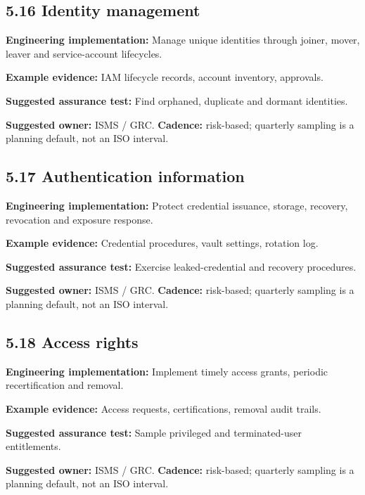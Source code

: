 \documentclass[11pt,letterpaper]{article}
\begin{document}
\subsection{5.16 Identity management}
\textbf{Engineering implementation:} Manage unique identities through joiner, mover, leaver and service-account lifecycles.\par
\textbf{Example evidence:} IAM lifecycle records, account inventory, approvals.\par
\textbf{Suggested assurance test:} Find orphaned, duplicate and dormant identities.\par
\textbf{Suggested owner:} ISMS / GRC. \textbf{Cadence:} risk-based; quarterly sampling is a planning default, not an ISO interval.\par
{}
\subsection{5.17 Authentication information}
\textbf{Engineering implementation:} Protect credential issuance, storage, recovery, revocation and exposure response.\par
\textbf{Example evidence:} Credential procedures, vault settings, rotation log.\par
\textbf{Suggested assurance test:} Exercise leaked-credential and recovery procedures.\par
\textbf{Suggested owner:} ISMS / GRC. \textbf{Cadence:} risk-based; quarterly sampling is a planning default, not an ISO interval.\par
{}
\subsection{5.18 Access rights}
\textbf{Engineering implementation:} Implement timely access grants, periodic recertification and removal.\par
\textbf{Example evidence:} Access requests, certifications, removal audit trails.\par
\textbf{Suggested assurance test:} Sample privileged and terminated-user entitlements.\par
\textbf{Suggested owner:} ISMS / GRC. \textbf{Cadence:} risk-based; quarterly sampling is a planning default, not an ISO interval.\par
{}
\end{document}
